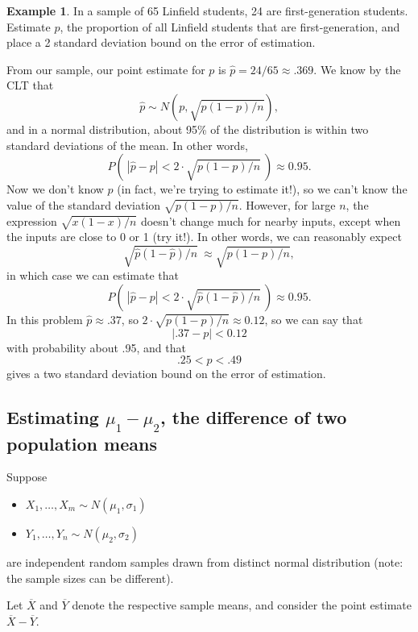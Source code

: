 \documentclass[
]{book}
\providecommand{\tightlist}{%
  \setlength{\itemsep}{0pt}\setlength{\parskip}{0pt}}
\theoremstyle{definition}
\theoremstyle{definition}
\newtheorem{example}{Example}[chapter]
\theoremstyle{definition}
\theoremstyle{definition}
\theoremstyle{remark}
\begin{document}
\begin{example}
In a sample of 65 Linfield students, 24 are first-generation students. Estimate \(p\), the proportion of all Linfield students that are first-generation, and place a 2 standard deviation bound on the error of estimation.

From our sample, our point estimate for \(p\) is \(\hat{p} = 24/65 \approx .369.\) We know by the CLT that \[\hat{p} \sim N(p, \sqrt{p(1-p)/n}),\]
and in a normal distribution, about 95\% of the distribution is within two standard deviations of the mean. In other words,
\[P\left(~|\hat{p}-p|<2\cdot\sqrt{p(1-p)/n}~\right) \approx 0.95.\]
Now we don't know \(p\) (in fact, we're trying to estimate it!), so we can't know the value of the standard deviation \(\sqrt{p(1-p)/n}.\) However, for large \(n\), the expression \(\sqrt{x(1-x)/n}\) doesn't change much for nearby inputs, except when the inputs are close to 0 or 1 (try it!). In other words, we can reasonably expect \[\sqrt{\hat{p}(1-\hat{p})/n} ~\approx \sqrt{p(1-p)/n},\] in which case we can estimate that
\[P\left(~|\hat{p}-p|<2\cdot\sqrt{\hat{p}(1-\hat{p})/n}~\right) \approx 0.95.\]
In this problem \(\hat{p} \approx .37\), so \(2 \cdot \sqrt{p(1-p)/n} \approx 0.12\), so we can say that \[|.37-p| < 0.12\] with probability about .95, and that
\[ .25 < p < .49\] gives a two standard deviation bound on the error of estimation.
\end{example}

\subsection{\texorpdfstring{Estimating \(\mu_1 - \mu_2\), the difference of two population means}{Estimating \textbackslash mu\_1 - \textbackslash mu\_2, the difference of two population means}}\label{estimating-mu_1---mu_2-the-difference-of-two-population-means}

Suppose

\begin{itemize}
\tightlist
\item
  \(X_1, \ldots, X_m \sim N(\mu_1,\sigma_1)\)
\item
  \(Y_1, \ldots, Y_n \sim N(\mu_2, \sigma_2)\)
\end{itemize}

are independent random samples drawn from distinct normal distribution (note: the sample sizes can be different).

Let \(\overline{X}\) and \(\overline{Y}\) denote the respective sample means, and consider the point estimate \(\overline{X}-\overline{Y}\).
\end{document}
